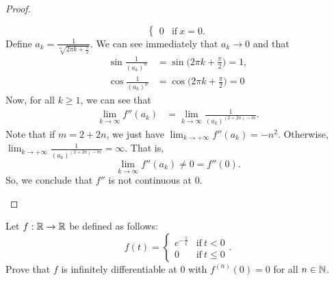 \documentclass[a4paper]{article}
\begin{document}
\begin{proof}
\begin{enumerate}
\[\begin{cases}
            0 &\text{if} \ x = 0.
        \end{cases} \]
        Define \( {a}_{k} = \frac{ 1 }{ \sqrt[n]{ 2 \pi k  + \frac{ \pi }{ 2 }  }  }  \). We can see immediately that \( {a}_{k } \to 0  \) and that  
        \begin{align*}
            \sin \frac{ 1 }{ ({a}_{k})^{n} } &= \sin \Big(2 \pi k  + \frac{ \pi }{ 2 }  \Big) = 1,  \\ 
            \cos \frac{ 1 }{ ({a}_{k})^{n} }  &= \cos \Big(  2 \pi k  + \frac{ \pi }{ 2 }  \Big) = 0 
        \end{align*}
        Now, for all \( k  \geq 1  \), we can see that 
        \begin{align*}
            \lim_{ k  \to  \infty  }  f''({a}_{k}) &= \lim_{ k  \to  \infty   }  \frac{ 1  }{ ({a}_{k})^{(2 + 2n) - m} }.
    \end{align*}
    Note that if \( m = 2 + 2n \), we just have \( \lim_{ k  \to + \infty  } f''({a}_{k}) = - n^{2}  \). Otherwise, \( \lim_{ k  \to  + \infty  } \frac{ 1 }{ ({a}_{k})^{(2+2n) - m} } = \infty  \). That is,
    \[  \lim_{ k  \to \infty  }  f''({a}_{k}) \neq 0 = f''(0). \]
    So, we conclude that \( f'' \) is not continuous at \( 0  \).
\end{enumerate}
\end{proof}
\begin{problem}
    Let \( f: \mathbb{R} \to \mathbb{R}  \) be defined as follows:
    \[  f(t) = 
    \begin{cases}
        e^{-\frac{ 1 }{ t } } &\text{if} \ t < 0 \\
        0 &\text{if} \ t \leq 0 
    \end{cases}. \]
    Prove that \( f  \) is infinitely differentiable at \( 0  \) with \( f^{(n)}(0) = 0  \) for all \( n \in \mathbb{N} \).
\end{problem}
\end{document}
